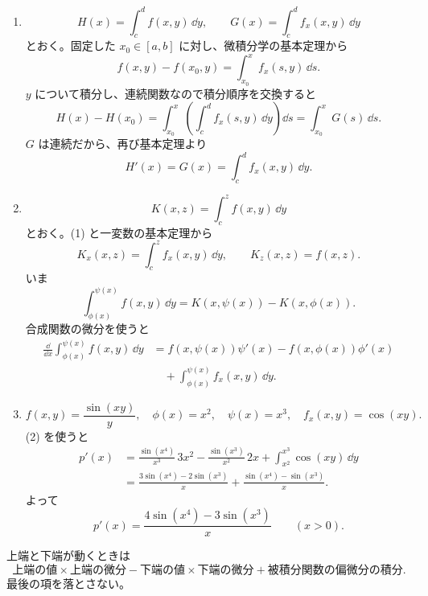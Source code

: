 \begin{enumerate}
  \item
  \[
  H(x)=\int_c^d f(x,y)\,\dd y,\qquad
  G(x)=\int_c^d f_x(x,y)\,\dd y
  \]
  とおく。固定した \(x_0\in[a,b]\) に対し、微積分学の基本定理から
  \[
  f(x,y)-f(x_0,y)=\int_{x_0}^x f_x(s,y)\,\dd s.
  \]
  \(y\) について積分し、連続関数なので積分順序を交換すると
  \[
  H(x)-H(x_0)
  =\int_{x_0}^x\left(\int_c^d f_x(s,y)\,\dd y\right)\dd s
  =\int_{x_0}^xG(s)\,\dd s.
  \]
  \(G\) は連続だから、再び基本定理より
  \[
  \boxed{H'(x)=G(x)=\int_c^d f_x(x,y)\,\dd y}.
  \]

  \item
  \[
  K(x,z)=\int_c^z f(x,y)\,\dd y
  \]
  とおく。(1) と一変数の基本定理から
  \[
  K_x(x,z)=\int_c^z f_x(x,y)\,\dd y,\qquad K_z(x,z)=f(x,z).
  \]
  いま
  \[
  \int_{\phi(x)}^{\psi(x)}f(x,y)\,\dd y
  =K(x,\psi(x))-K(x,\phi(x)).
  \]
  合成関数の微分を使うと
  \begin{align*}
  \frac{\dd}{\dd x}\int_{\phi(x)}^{\psi(x)}f(x,y)\,\dd y
  &=
  f(x,\psi(x))\psi'(x)-f(x,\phi(x))\phi'(x)\\
  &\quad+\int_{\phi(x)}^{\psi(x)}f_x(x,y)\,\dd y.
  \end{align*}

  \item
  \[
  f(x,y)=\frac{\sin(xy)}y,\quad
  \phi(x)=x^2,\quad\psi(x)=x^3,\quad
  f_x(x,y)=\cos(xy).
  \]
  (2) を使うと
  \begin{align*}
  p'(x)
  &=\frac{\sin(x^4)}{x^3}\,3x^2
  -\frac{\sin(x^3)}{x^2}\,2x
  +
  \int_{x^2}^{x^3}\cos(xy)\,\dd y\\
  &=\frac{3\sin(x^4)-2\sin(x^3)}x
  +\frac{\sin(x^4)-\sin(x^3)}x.
  \end{align*}
  よって
  \[
  \boxed{p'(x)=\frac{4\sin(x^4)-3\sin(x^3)}x}\qquad(x>0).
  \]
\end{enumerate}

\begin{pointbox}[確認]
上端と下端が動くときは
\[
\text{上端の値}\times\text{上端の微分}
-\text{下端の値}\times\text{下端の微分}
+\text{被積分関数の偏微分の積分}.
\]
最後の項を落とさない。
\end{pointbox}


